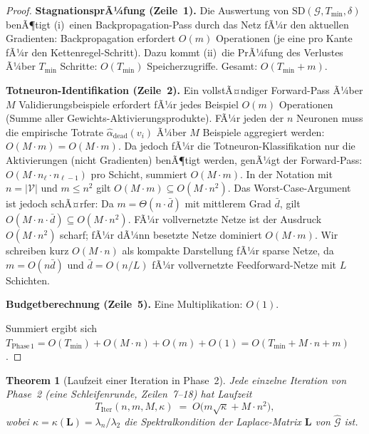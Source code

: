 ﻿\documentclass[12pt, a4paper, openany]{report}
\newtheorem{theorem}{Theorem}[chapter]
\newcommand{\calG}{\mathcal{G}}
\newcommand{\calV}{\mathcal{V}}
\begin{document}
\begin{proof}
\textbf{StagnationsprÃ¼fung (Zeile~1).}
Die Auswertung von $\mathrm{SD}(\calG, T_{\min}, \delta)$ benÃ¶tigt
(i)~einen Backpropagation-Pass durch das Netz fÃ¼r den aktuellen Gradienten:
Backpropagation erfordert $O(m)$ Operationen (je eine pro Kante fÃ¼r
den Kettenregel-Schritt).  Dazu kommt (ii)~die PrÃ¼fung des Verlustes Ã¼ber
$T_{\min}$ Schritte: $O(T_{\min})$ Speicherzugriffe.
Gesamt: $O(T_{\min} + m)$.

\textbf{Totneuron-Identifikation (Zeile~2).}
Ein vollstÃ¤ndiger Forward-Pass Ã¼ber $M$ Validierungsbeispiele erfordert
fÃ¼r jedes Beispiel $O(m)$ Operationen (Summe aller Gewichts-Aktivierungsprodukte).
FÃ¼r jeden der $n$ Neuronen muss die empirische Totrate
$\hat{\alpha}_{\mathrm{dead}}(v_i)$ Ã¼ber $M$ Beispiele aggregiert werden:
$O(M \cdot m) = O(M \cdot m)$.
Da jedoch fÃ¼r die Totneuron-Klassifikation nur die Aktivierungen
(nicht Gradienten) benÃ¶tigt werden, genÃ¼gt der Forward-Pass:
$O(M \cdot n_\ell \cdot n_{\ell-1})$ pro Schicht, summiert $O(M \cdot m)$.
In der Notation mit $n = |\calV|$ und $m \leq n^2$ gilt
$O(M \cdot m) \subseteq O(M \cdot n^2)$.
Das Worst-Case-Argument ist jedoch schÃ¤rfer: Da $m = \Theta(n \cdot \bar{d})$
mit mittlerem Grad $\bar{d}$, gilt $O(M \cdot n \cdot \bar{d}) \subseteq O(M \cdot n^2)$.
FÃ¼r vollvernetzte Netze ist der Ausdruck $O(M \cdot n^2)$
scharf; fÃ¼r dÃ¼nn besetzte Netze dominiert $O(M \cdot m)$.  Wir schreiben
kurz $O(M \cdot n)$ als kompakte Darstellung fÃ¼r sparse Netze, da
$m = O(n \bar d)$ und $\bar d = O(n/L)$ fÃ¼r vollvernetzte Feedforward-Netze
mit $L$ Schichten.

\textbf{Budgetberechnung (Zeile~5).}
Eine Multiplikation: $O(1)$.

Summiert ergibt sich $T_{\mathrm{Phase\,1}} = O(T_{\min}) + O(M \cdot n) + O(m) + O(1)
= O(T_{\min} + M \cdot n + m)$.
\end{proof}

\begin{theorem}[Laufzeit einer Iteration in Phase~2]
\label{thm:runtime_phase2_iter}
Jede einzelne Iteration von Phase~2 (eine Schleifenrunde, Zeilen~7--18)
hat Laufzeit
\begin{equation}
  \label{eq:runtime_iteration}
  T_{\mathrm{Iter}}(n, m, M, \kappa)
  \;=\;
  O\!\bigl(m \sqrt{\kappa} + M \cdot n^2\bigr),
\end{equation}
wobei $\kappa = \kappa(\bm{L}) = \lambda_n / \lambda_2$ die
Spektralkondition der Laplace-Matrix $\bm{L}$ von $\hat{\calG}$ ist.
\end{theorem}
\end{document}
